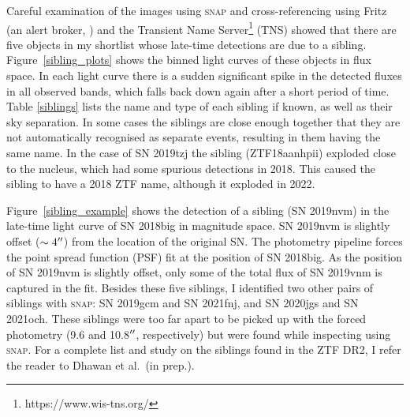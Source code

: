 \documentclass[a4paper,oneside,12pt, class=Latex/Classes/PhDthesisPSnPDF, crop=false]{standalone}
\begin{document}
Careful examination of the images using \textsc{snap} and cross-referencing using Fritz (an alert broker, \citealt{skyportal2019, duev2019realbogus, Kasliwal_Growth, Skyportal}) and the Transient Name Server\footnote{https://www.wis-tns.org/} (TNS) showed that there are five objects in my shortlist whose late-time detections are due to a sibling. Figure~\ref{sibling_plots} shows the binned light curves of these objects in flux space. In each light curve there is a sudden significant spike in the detected fluxes in all observed bands, which falls back down again after a short period of time. Table \ref{siblings} lists the name and type of each sibling if known, as well as their sky separation. In some cases the siblings are close enough together that they are not automatically recognised as separate events, resulting in them having the same name. In the case of SN 2019tzj the sibling (ZTF18aanhpii) exploded close to the nucleus, which had some spurious detections in 2018. This caused the sibling to have a 2018 ZTF name, although it exploded in 2022.

Figure~\ref{sibling_example} shows the detection of a sibling (SN 2019nvm) in the late-time light curve of SN 2018big in magnitude space. SN 2019nvm is slightly offset ($\sim4^{\prime\prime}$) from the location of the original SN. The photometry pipeline forces the point spread function (PSF) fit at the position of SN 2018big. As the position of SN 2019nvm is slightly offset, only some of the total flux of SN 2019vnm is captured in the fit. Besides these five siblings, I identified two other pairs of siblings with \textsc{snap}: SN 2019gcm and SN 2021fnj, and SN 2020jgs and SN 2021och. These siblings were too far apart to be picked up with the forced photometry (9.6 and 10.8$^{\prime\prime}$, respectively) but were found while inspecting using \textsc{snap}. For a complete list and study on the siblings found in the ZTF DR2, I refer the reader to Dhawan et al.~(in prep.).
\end{document}
